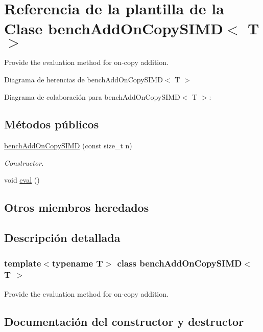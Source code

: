 \hypertarget{classbenchAddOnCopySIMD}{}\section{Referencia de la plantilla de la Clase bench\+Add\+On\+Copy\+S\+I\+MD$<$ T $>$}
\label{classbenchAddOnCopySIMD}


Provide the evaluation method for on-\/copy addition.  




Diagrama de herencias de bench\+Add\+On\+Copy\+S\+I\+MD$<$ T $>$


Diagrama de colaboración para bench\+Add\+On\+Copy\+S\+I\+MD$<$ T $>$\+:
\subsection*{Métodos públicos}
\begin{DoxyCompactItemize}
\item 
\hyperlink{classbenchAddOnCopySIMD_aae3e85615189f2b0b55f3b5a35e65c04}{bench\+Add\+On\+Copy\+S\+I\+MD} (const size\+\_\+t n)
\begin{DoxyCompactList}\small\item\em Constructor. \end{DoxyCompactList}\item 
void \hyperlink{classbenchAddOnCopySIMD_a826842d62d4f06661183a7260eb91ee4}{eval} ()
\end{DoxyCompactItemize}
\subsection*{Otros miembros heredados}


\subsection{Descripción detallada}
\subsubsection*{template$<$typename T$>$\newline
class bench\+Add\+On\+Copy\+S\+I\+M\+D$<$ T $>$}

Provide the evaluation method for on-\/copy addition. 

\subsection{Documentación del constructor y destructor}
\mbox{\label{classbenchAddOnCopySIMD_aae3e85615189f2b0b55f3b5a35e65c04}} 
